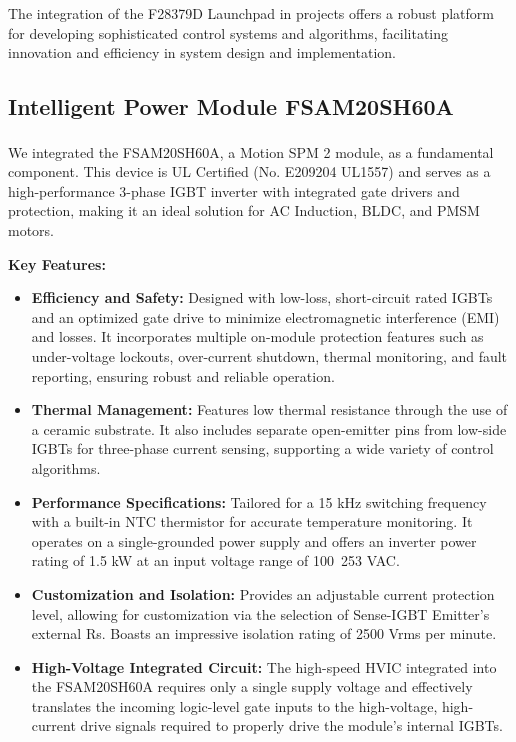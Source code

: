 The integration of the F28379D Launchpad in projects offers a robust platform for developing sophisticated control systems and algorithms, facilitating innovation and efficiency in system design and implementation.



\subsection{Intelligent Power Module FSAM20SH60A}


We integrated the FSAM20SH60A, a Motion SPM\textsuperscript{\textregistered} 2 module, as a fundamental component. This device is UL Certified (No. E209204 UL1557) and serves as a high-performance 3-phase IGBT inverter with integrated gate drivers and protection, making it an ideal solution for AC Induction, BLDC, and PMSM motors.

\textbf{Key Features:}
\begin{itemize}
    \item \textbf{Efficiency and Safety:} Designed with low-loss, short-circuit rated IGBTs and an optimized gate drive to minimize electromagnetic interference (EMI) and losses. It incorporates multiple on-module protection features such as under-voltage lockouts, over-current shutdown, thermal monitoring, and fault reporting, ensuring robust and reliable operation.
    \item \textbf{Thermal Management:} Features low thermal resistance through the use of a ceramic substrate. It also includes separate open-emitter pins from low-side IGBTs for three-phase current sensing, supporting a wide variety of control algorithms.
    \item \textbf{Performance Specifications:} Tailored for a 15 kHz switching frequency with a built-in NTC thermistor for accurate temperature monitoring. It operates on a single-grounded power supply and offers an inverter power rating of 1.5 kW at an input voltage range of 100~253 VAC.
    \item \textbf{Customization and Isolation:} Provides an adjustable current protection level, allowing for customization via the selection of Sense-IGBT Emitter's external Rs. Boasts an impressive isolation rating of 2500 Vrms per minute.
    \item \textbf{High-Voltage Integrated Circuit:} The high-speed HVIC integrated into the FSAM20SH60A requires only a single supply voltage and effectively translates the incoming logic-level gate inputs to the high-voltage, high-current drive signals required to properly drive the module's internal IGBTs.
\end{itemize}

